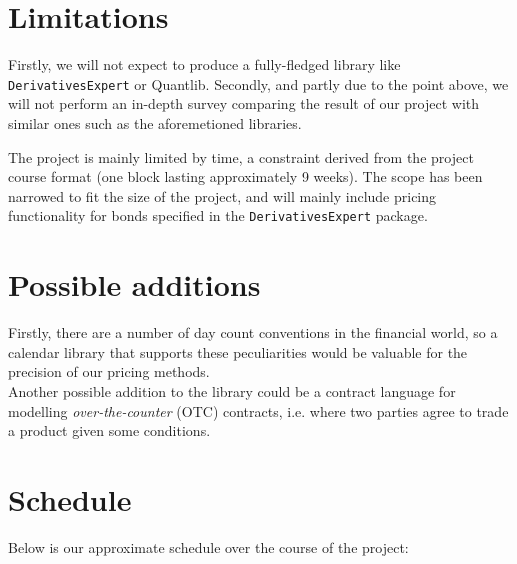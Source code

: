 \documentclass[11pt]{article}
\begin{document}
\section*{Limitations}

Firstly, we will not expect to produce a fully-fledged library like {\tt DerivativesExpert} or Quantlib\cite{Ame2003}.
Secondly, and partly due to the point above, we will not perform an in-depth survey
comparing the result of our project with similar ones such as the aforemetioned libraries.


The project is mainly limited by time, a constraint derived from the project course 
format (one block lasting approximately 9 weeks).
The scope has been narrowed to fit the size of the project, and will mainly include
pricing functionality for bonds specified in the {\tt DerivativesExpert} package.

\section*{Possible additions}

Firstly, there are a number of day count conventions in the financial world, so a
calendar library that supports these peculiarities would be valuable for the precision
of our pricing methods.\\

Another possible addition to the library could be a contract language for modelling
\emph{over-the-counter} (OTC) contracts, i.e. where two parties agree to trade a
product given some conditions. 

\section*{Schedule}


Below is our approximate schedule over the course of the project:\\

\begin{figure}[h!]
\begin{center}
\end{center}
\end{figure}



\end{document}
